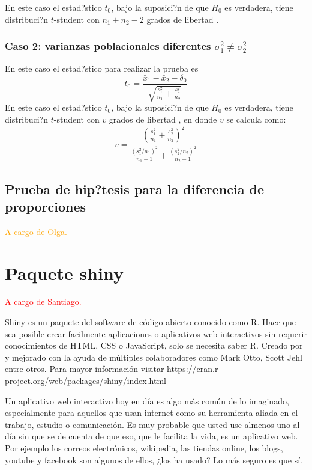 \documentclass[]{comunicaciones}
\newcommand{\pkg}[1]{{\normalfont\fontseries{b}\selectfont #1}}
\begin{document}
En este caso el estad?stico $t_0$, bajo la suposici?n de que $H_0$ es verdadera, tiene distribuci?n $t$-student con $n_1+n_2-2$ grados de libertad \cite{Walpole12}.

\subsubsection{Caso 2: varianzas poblacionales diferentes $\sigma_1^2 \neq \sigma_2^2$}
En este caso el estad?stico para realizar la prueba es 
$$t_0=\frac{\bar{x}_1 - \bar{x}_2 - \delta_0}{\sqrt{\frac{s_1^2}{n_1} + \frac{s_2^2}{n_2}}}$$
En este caso el estad?stico $t_0$, bajo la suposici?n de que $H_0$ es verdadera, tiene distribuci?n $t$-student con $v$ grados de libertad \cite{Walpole12}, en donde $v$ se calcula como:
$$v=\frac{ \left( \frac{s_1^2}{n_1} + \frac{s_2^2}{n_2} \right)^2 }{ \frac{(s_1^2/n_1)^2}{n_1-1} + \frac{(s_2^2/n_2)^2}{n_2-1}}$$

\subsection{Prueba de hip?tesis para la diferencia de proporciones}
\textcolor{orange}{A cargo de Olga.}

\section{Paquete \pkg{shiny}}
\textcolor{red}{A cargo de Santiago.}

Shiny es un paquete del software de código abierto conocido como R. Hace que sea posible crear facilmente aplicaciones o aplicativos web interactivos sin requerir conocimientos de HTML, CSS o JavaScript, solo se necesita saber R. Creado por \cite{Winston17} y mejorado con la ayuda de múltiples colaboradores como Mark Otto, Scott Jehl entre otros. Para mayor información visitar https://cran.r-project.org/web/packages/shiny/index.html

Un aplicativo web interactivo hoy en día es algo más común de lo imaginado, especialmente para aquellos que usan internet como su herramienta aliada en el trabajo, estudio o comunicación. Es muy probable que usted use almenos uno al día sin que se de cuenta de que eso, que le facilita la vida, es un aplicativo web. Por ejemplo los correos electrónicos, wikipedia, las tiendas online, los blogs, youtube y facebook son algunos de ellos, ¿los ha usado? Lo más seguro es que sí.
\end{document}
